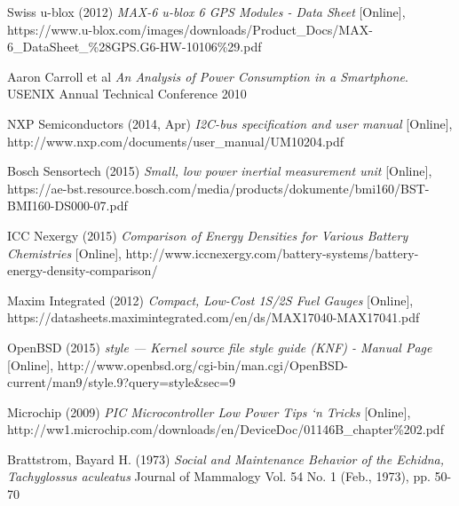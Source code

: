\documentclass[12pt,openany,a4paper]{book}
\begin{document}
\begin{thebibliography}{99}
	Swiss u-blox (2012)
	\emph{MAX-6 u-blox 6 GPS Modules - Data Sheet} [Online],
	https://www.u-blox.com/images/downloads/Product\_Docs/MAX-6\_DataSheet\_\%28GPS.G6-HW-10106\%29.pdf
	
	Aaron Carroll et al \emph{An Analysis of Power Consumption in a Smartphone}.
	USENIX Annual Technical Conference 2010
	
	NXP Semiconductors (2014, Apr)
	\emph{I2C-bus specification and user manual} [Online],
	http://www.nxp.com/documents/user\_manual/UM10204.pdf
	
	Bosch Sensortech (2015)
	\emph{Small, low power inertial measurement unit} [Online], https://ae-bst.resource.bosch.com/media/products/dokumente/bmi160/BST-BMI160-DS000-07.pdf
	
	ICC Nexergy (2015)
	\emph{Comparison of Energy Densities for Various Battery Chemistries} [Online], http://www.iccnexergy.com/battery-systems/battery-energy-density-comparison/
	
	Maxim Integrated (2012)
	\emph{Compact, Low-Cost 1S/2S Fuel Gauges} [Online], https://datasheets.maximintegrated.com/en/ds/MAX17040-MAX17041.pdf
	
	OpenBSD (2015)
	\emph{style — Kernel source file style guide (KNF) - Manual Page} [Online], http://www.openbsd.org/cgi-bin/man.cgi/OpenBSD-current/man9/style.9?query=style\&sec=9
	
	Microchip (2009)
	\emph{PIC Microcontroller Low Power
		Tips ‘n Tricks} [Online], http://ww1.microchip.com/downloads/en/DeviceDoc/01146B\_chapter\%202.pdf
	
	Brattstrom, Bayard H. (1973)
	\emph{Social and Maintenance Behavior of the Echidna, Tachyglossus aculeatus}
	Journal of Mammalogy Vol. 54 No. 1 (Feb., 1973), pp. 50-70
\end{thebibliography}
\end{document}
